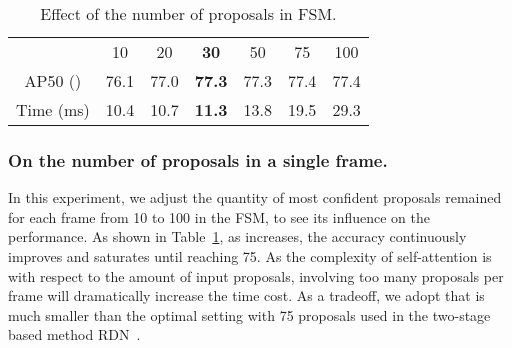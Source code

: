 \documentclass[letterpaper]{article} \usepackage{aaai23}  \usepackage{times}  \usepackage{helvet}  \usepackage{courier}  \usepackage[hyphens]{url}  \usepackage{graphicx} \urlstyle{rm} \def\UrlFont{\rm}  \usepackage{natbib}  \usepackage{caption} \usepackage{xcolor}
\begin{document}
\setlength{\tabcolsep}{4pt}
\begin{table}
\begin{center}
\begin{tabular}{c|cccccc}
\hline\noalign{\smallskip}
 & 10 & 20 & \textbf{30} & 50 & 75 & 100\\
\noalign{\smallskip}
\hline
\noalign{\smallskip}
AP50 () & 76.1 & 77.0 & \textbf{77.3} & 77.3 & 77.4 & 77.4 \\
\hline
\noalign{\smallskip}
Time (ms) & 10.4 & 10.7 & \textbf{11.3} & 13.8 & 19.5 & 29.3 \\
\hline
\end{tabular}
\end{center}
\caption{Effect of the number of proposals  in FSM.}
\label{table:effectiveness of a in fsm}
\end{table}



\subsubsection{On the number of proposals in a single frame.}
In this experiment, we adjust the quantity of most confident proposals remained for each frame  from 10 to 100 in the FSM, to see its influence on the performance. As shown in Table~\ref{table:effectiveness of a in fsm}, as  increases, the accuracy continuously improves and saturates until reaching 75. As the complexity of self-attention is  with respect to the amount of input proposals, involving too many proposals per frame will dramatically increase the time cost. As a tradeoff, we adopt  that is much smaller than the optimal setting with 75 proposals used in the two-stage based method RDN~\cite{deng2019relation}. 
\end{document}
